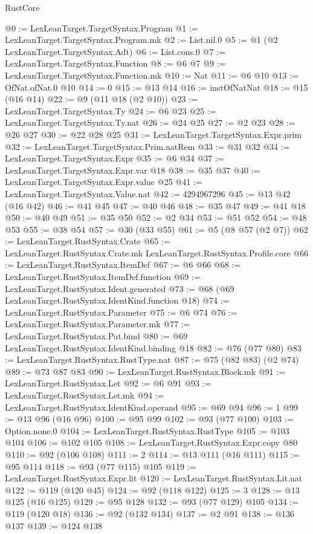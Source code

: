 \begin{lexlean}{RustCore}
\begin{coremodule}
@0 := LexLeanTarget.TargetSyntax.Program
@1 := LexLeanTarget.TargetSyntax.Program.mk
@2 := List.nil.{0}
@5 := @1 (@2 LexLeanTarget.TargetSyntax.Adt)
@6 := List.cons.{0}
@7 := LexLeanTarget.TargetSyntax.Function
@8 := @6 @7
@9 := LexLeanTarget.TargetSyntax.Function.mk
@10 := Nat
@11 := @6 @10
@13 := OfNat.ofNat.{0} @10
@14 := 0
@15 := @13 @14
@16 := instOfNatNat
@18 := @15 (@16 @14)
@22 := @9 (@11 @18 (@2 @10))
@23 := LexLeanTarget.TargetSyntax.Ty
@24 := @6 @23
@25 := LexLeanTarget.TargetSyntax.Ty.nat
@26 := @24 @25
@27 := @2 @23
@28 := @26 @27
@30 := @22 @28 @25
@31 := LexLeanTarget.TargetSyntax.Expr.prim
@32 := LexLeanTarget.TargetSyntax.Prim.natRem
@33 := @31 @32
@34 := LexLeanTarget.TargetSyntax.Expr
@35 := @6 @34
@37 := LexLeanTarget.TargetSyntax.Expr.var @18
@38 := @35 @37
@40 := LexLeanTarget.TargetSyntax.Expr.value @25
@41 := LexLeanTarget.TargetSyntax.Value.nat
@42 := 4294967296
@45 := @13 @42 (@16 @42)
@46 := @41 @45
@47 := @40 @46
@48 := @35 @47
@49 := @41 @18
@50 := @40 @49
@51 := @35 @50
@52 := @2 @34
@53 := @51 @52
@54 := @48 @53
@55 := @38 @54
@57 := @30 (@33 @55)
@61 := @5 (@8 @57 (@2 @7))
@62 := LexLeanTarget.RustSyntax.Crate
@65 := LexLeanTarget.RustSyntax.Crate.mk LexLeanTarget.RustSyntax.Profile.core
@66 := LexLeanTarget.RustSyntax.ItemDef
@67 := @6 @66
@68 := LexLeanTarget.RustSyntax.ItemDef.function
@69 := LexLeanTarget.RustSyntax.Ident.generated
@73 := @68 (@69 LexLeanTarget.RustSyntax.IdentKind.function @18)
@74 := LexLeanTarget.RustSyntax.Parameter
@75 := @6 @74
@76 := LexLeanTarget.RustSyntax.Parameter.mk
@77 := LexLeanTarget.RustSyntax.Pat.bind
@80 := @69 LexLeanTarget.RustSyntax.IdentKind.binding @18
@82 := @76 (@77 @80)
@83 := LexLeanTarget.RustSyntax.RustType.nat
@87 := @75 (@82 @83) (@2 @74)
@89 := @73 @87 @83
@90 := LexLeanTarget.RustSyntax.Block.mk
@91 := LexLeanTarget.RustSyntax.Let
@92 := @6 @91
@93 := LexLeanTarget.RustSyntax.Let.mk
@94 := LexLeanTarget.RustSyntax.IdentKind.operand
@95 := @69 @94
@96 := 1
@99 := @13 @96 (@16 @96)
@100 := @95 @99
@102 := @93 (@77 @100)
@103 := Option.none.{0}
@104 := LexLeanTarget.RustSyntax.RustType
@105 := @103 @104
@106 := @102 @105
@108 := LexLeanTarget.RustSyntax.Expr.copy @80
@110 := @92 (@106 @108)
@111 := 2
@114 := @13 @111 (@16 @111)
@115 := @95 @114
@118 := @93 (@77 @115) @105
@119 := LexLeanTarget.RustSyntax.Expr.lit
@120 := LexLeanTarget.RustSyntax.Lit.nat
@122 := @119 (@120 @45)
@124 := @92 (@118 @122)
@125 := 3
@128 := @13 @125 (@16 @125)
@129 := @95 @128
@132 := @93 (@77 @129) @105
@134 := @119 (@120 @18)
@136 := @92 (@132 @134)
@137 := @2 @91
@138 := @136 @137
@139 := @124 @138

\end{coremodule}
\end{lexlean}
